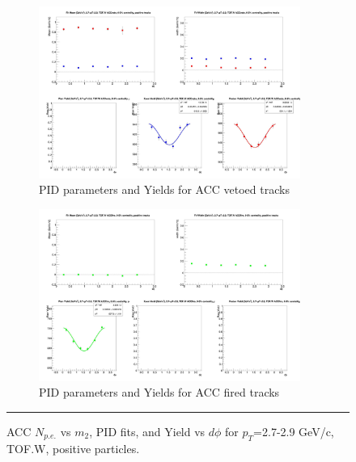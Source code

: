 \begin{figure}[H]
  \ContinuedFloat
    \vspace*{-1cm}
    \begin{subfigure}{1\textwidth}
   \centering
   \includegraphics[width=0.94\textwidth]{hiptfits/pos/fitParams_tof2_cent0_ch1_pT-27-29.jpg}
    \caption{PID parameters and Yields for ACC vetoed tracks}
    \end{subfigure}    
    \begin{subfigure}{1\textwidth}
   \centering
   \includegraphics[width=0.94\textwidth]{hiptfits/pos/fitParams_tof3_cent0_ch1_pT-27-29.jpg}
    \caption{PID parameters and Yields for ACC fired tracks}
    \end{subfigure} 
    \rule{35em}{0.5pt}
  \caption[ACC $N_{p.e.}$ vs $m_2$, PID fits, and Yield vs $d\phi$ for $p_T$=2.7-2.9 GeV/c, TOF.W, positive particles.]{ACC $N_{p.e.}$ vs $m_2$, PID fits, and Yield vs $d\phi$ for $p_T$=2.7-2.9 GeV/c, TOF.W, positive particles.}
  \label{fig:acc27-29pos}
\end{figure}


